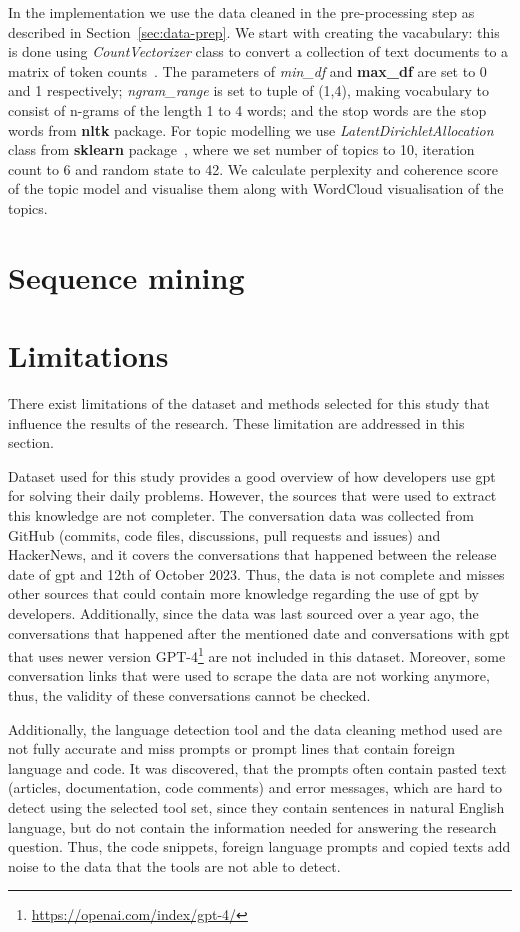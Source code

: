 In the implementation we use the data cleaned in the pre-processing step as described in Section~\ref{sec:data-prep}. We start with creating the vacabulary: this is done using \textit{CountVectorizer} class to convert a collection of text documents to a matrix of token counts~\cite{scikitlearnCountVectorizer}. The parameters of \textit{min\_df} and \textbf{max\_df} are set to 0 and 1 respectively; \textit{ngram\_range} is set to tuple of (1,4), making vocabulary to consist of n-grams of the length 1 to 4 words; and the stop words are the stop words from \textbf{nltk} package. For topic modelling we use \textit{LatentDirichletAllocation} class from \textbf{sklearn} package~\cite{scikitlearnLatentDirichletAllocation}, where we set number of topics to 10, iteration count to 6 and random state to 42. We calculate perplexity and coherence score of the topic model and visualise them along with WordCloud visualisation of the topics. 

\section{Sequence mining}

\section{Limitations}
There exist limitations of the dataset and methods selected for this study that influence the results of the research. These limitation are addressed in this section. 

Dataset used for this study provides a good overview of how developers use \gls{gpt} for solving their daily problems. However, the sources that were used to extract this knowledge are not completer. The conversation data was collected from GitHub (commits, code files, discussions, pull requests and issues) and HackerNews, and it covers the conversations that happened between the release date of \gls{gpt} and 12th of October 2023. Thus, the data is not complete and misses other sources that could contain more knowledge regarding the use of \gls{gpt} by developers. Additionally, since the data was last sourced over a year ago, the conversations that happened after the mentioned date and conversations with \gls{gpt} that uses newer version GPT-4\footnote{\url{https://openai.com/index/gpt-4/}} are not included in this dataset. Moreover, some conversation links that were used to scrape the data are not working anymore, thus, the validity of these conversations cannot be checked.

Additionally, the language detection tool and the data cleaning method used are not fully accurate and miss prompts or prompt lines that contain foreign language and code. It was discovered, that the prompts often contain pasted text (articles, documentation, code comments) and error messages, which are hard to detect using the selected tool set, since they contain sentences in natural English language, but do not contain the information needed for answering the research question. Thus, the code snippets, foreign language prompts and copied texts add noise to the data that the tools are not able to detect.